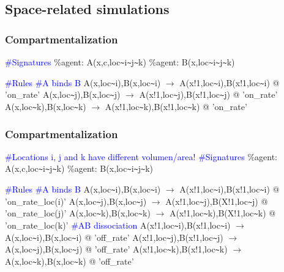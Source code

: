 \documentclass[xcolor=dvipsnames]{beamer}
\def\int{\hbox{\texttt{\~}}}
\begin{document}
\subsection{Space-related simulations}
\begin{frame}
  \frametitle{Compartmentalization}
  \begin{flushleft} {\scriptsize
    \textcolor{blue}{\#Signatures} \newline
    \%agent: A(x,c,loc\int i\int j\int k) \newline
    \%agent: B(x,loc\int i\int j\int k) \pause
    \item \textcolor{blue}{\#Rules} \newline
    \textcolor{blue}{\#A binds B} \newline
    A(x,loc\int i),B(x,loc\int i) $\rightarrow$ A(x!1,loc\int i),B(x!1,loc\int i) @ 'on\_rate' \newline
    A(x,loc\int j),B(x,loc\int j) $\rightarrow$ A(x!1,loc\int j),B(x!1,loc\int j) @ 'on\_rate' \newline
    A(x,loc\int k),B(x,loc\int k) $\rightarrow$ A(x!1,loc\int k),B(x!1,loc\int k) @ 'on\_rate' \newline }
  \end{flushleft}
\end{frame}

\begin{frame}
  \frametitle{Compartmentalization}
  \begin{flushleft} {\scriptsize
    \textcolor{blue}{\#Locations i, j and k have different volumen/area!} \newline \pause
    \textcolor{blue}{\#Signatures} \newline
    \%agent: A(x,c,loc\int i\int j\int k) \newline
    \%agent: B(x,loc\int i\int j\int k)
    \item \textcolor{blue}{\#Rules} \newline
    \textcolor{blue}{\#A binds B} \newline
    A(x,loc\int i),B(x,loc\int i) $\rightarrow$ A(x!1,loc\int i),B(x!1,loc\int i) @ 'on\_rate\_loc(i)' \newline
    A(x,loc\int j),B(x,loc\int j) $\rightarrow$ A(x!1,loc\int j),B(X!1,loc\int j) @ 'on\_rate\_loc(j)' \newline
    A(x,loc\int k),B(x,loc\int k) $\rightarrow$ A(x!1,loc\int k),B(X!1,loc\int k) @ 'on\_rate\_loc(k)' \newline \pause
    \textcolor{blue}{\#AB dissociation} \newline
    A(x!1,loc\int i),B(x!1,loc\int i) $\rightarrow$ A(x,loc\int i),B(x,loc\int i) @ 'off\_rate' \newline
    A(x!1,loc\int j),B(x!1,loc\int j) $\rightarrow$ A(x,loc\int j),B(x,loc\int j) @ 'off\_rate' \newline
    A(x!1,loc\int k),B(x!1,loc\int k) $\rightarrow$ A(x,loc\int k),B(x,loc\int k) @ 'off\_rate' \newline }
  \end{flushleft}
\end{frame}
\end{document}
